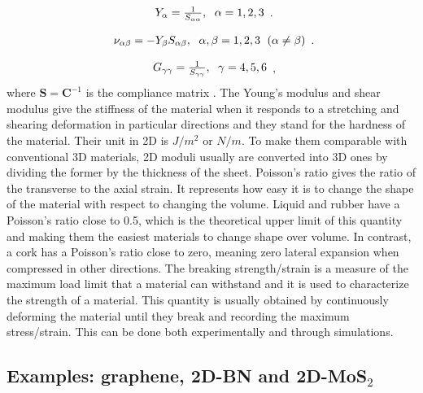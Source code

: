 \begin{equation}
\begin{array}{c}

Y_\alpha=\frac{1}{S_{\alpha\alpha}},\hspace{6 pt} \alpha = 1, 2, 3
\end{array}.
\end{equation}

\begin{equation}
\begin{array}{c}
\nu_{\alpha\beta}=-Y_\beta S_{\alpha\beta},\hspace{6 pt} \alpha, \beta = 1, 2, 3 
\hspace{6 pt}(\alpha\neq\beta)
\end{array}.
\end{equation}

\begin{equation}
\begin{array}{c}
G_{\gamma\gamma}=\frac{1}{S_{\gamma\gamma}} ,\hspace{6 pt} \gamma = 4, 5, 6
\end{array},
\end{equation}
where $\boldsymbol{S}=\boldsymbol{C}^{-1}$ is the compliance matrix \citep[e.g.][]{nye1985physical}. The Young's modulus and shear modulus give the stiffness of the material when it responds to a stretching and shearing deformation in particular directions and they stand for the hardness of the material. Their unit in 2D is $J/m^2$ or $N/m$. To make them comparable with conventional 3D materials, 2D moduli usually are converted into 3D ones by dividing the former by the thickness of the sheet. Poisson's ratio gives the ratio of the transverse to the axial strain. It represents how easy it is to change the shape of the material with respect to changing the volume. Liquid and rubber have a Poisson's ratio close to 0.5, which is the theoretical upper limit of this quantity and making them the easiest materials to change shape over volume. In contrast, a cork has a Poisson's ratio close to zero, meaning zero lateral expansion when compressed in other directions. The breaking strength/strain is a measure of the maximum load limit that a material can withstand and it is used to characterize the strength of a material. This quantity is usually obtained by continuously deforming the material until they break and recording the maximum stress/strain. This can be done both experimentally and through simulations. 

\subsection{Examples: graphene, 2D-BN and 2D-MoS$_2$}

